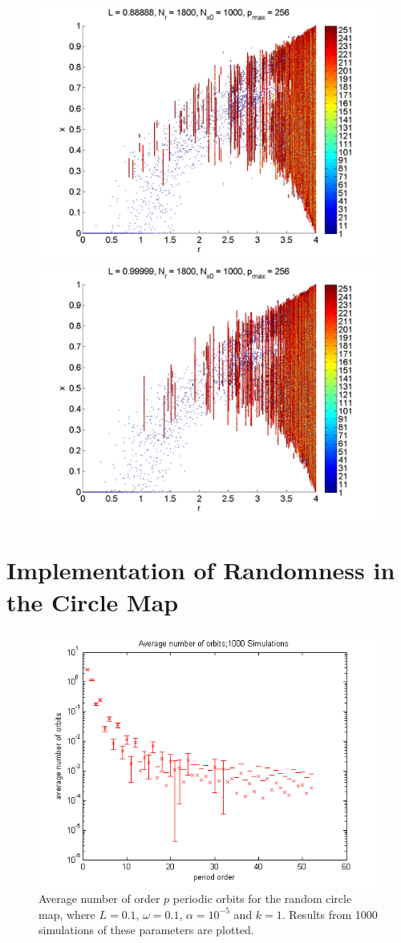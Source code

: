 \begin{figure}[H]
\begin{center}
		\includegraphics[width=.5\textwidth]{figs/rlog_bif_L_08.png}\hfill
		\includegraphics[width=.5\textwidth]{figs/rlog_bif_L_09.png}\\
	\end{center}
\end{figure}

\section{Implementation of Randomness in the Circle Map}
\begin{figure}[H]\linespread{1}
\caption[Average number of order $p$ orbits for the random circle
map]{Average number of order $p$ periodic orbits for the random circle
map, where $L=0.1$, $\omega =0.1$, $\alpha = 10^{-5}$ and $k=1$. Results from 1000
simulations of these parameters are plotted.}
	\begin{center}
		\includegraphics[scale=0.7]{figs/rcirc_avg_num_1000_sim_logscale.png}
	\end{center}
\end{figure}

